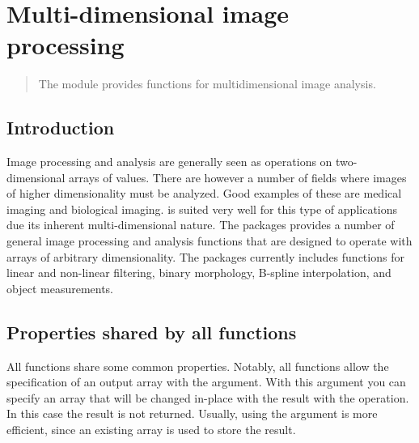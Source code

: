 \chapter{Multi-dimensional image processing}
\label{cha:ndimage}

\makeatletter
\py@reset
\makeatother

\begin{quote}
  The  module provides functions for
  multidimensional image analysis.
\end{quote}

\section{Introduction}
Image processing and analysis are generally seen as operations on
two-dimensional arrays of values. There are however a number of fields
where images of higher dimensionality must be analyzed. Good examples
of these are medical imaging and biological imaging. 
is suited very well for this type of applications due its inherent
multi-dimensional nature. The  packages
provides a number of general image processing and analysis functions
that are designed to operate with arrays of arbitrary dimensionality.
The packages currently includes functions for linear and non-linear
filtering, binary morphology, B-spline interpolation, and object
measurements.

\section{Properties shared by all functions}
All functions share some common properties. Notably, all functions allow the 
specification of an output array with the  argument. With this 
argument you can specify an array that will be changed in-place with the 
result with the operation. In this case the result is not returned. Usually, 
using the  argument is more efficient, since an existing array 
is used to store the result.

